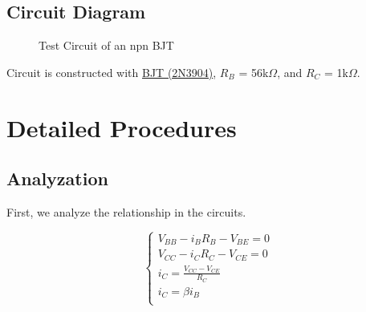     \subsection{Circuit Diagram}
        \begin{figure}[h]
            \centering
            
            \caption{Test Circuit of an npn BJT}
            \label{L4F}
        \end{figure}
        \FloatBarrier
Circuit is constructed with \hyperref[2N3904_1]{BJT (2N3904)}, $R_B$ = 56k$\Omega$, and $R_C$ = 1k$\Omega$.
\section{Detailed Procedures}
    \subsection{Analyzation}
    First, we analyze the relationship in the circuits.\par
    \begin{equation}
        \begin{cases}
            V_{BB} - i_BR_B - V_{BE} = 0\\
            V_{CC} - i_CR_C - V_{CE} = 0\\
            i_C = \frac{V_{CC} - V_{CE}}{R_C}\\
            i_C = \beta i_B\\
        \end{cases}
    \end{equation}

